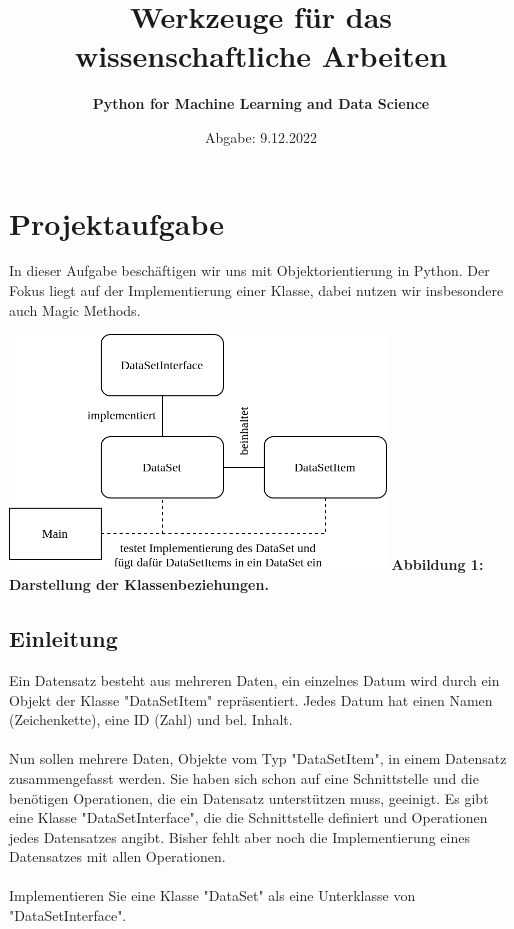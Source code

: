 \documentclass{article}
\begin{document}
	\title{\bf Werkzeuge für das wissenschaftliche Arbeiten}
	\author{\bf Python for Machine Learning and Data Science}
	\date{Abgabe: 9.12.2022}
	\maketitle
	
	\tableofcontents
	
	\section{Projektaufgabe}
		In dieser Aufgabe beschäftigen wir uns mit Objektorientierung in Python.
		Der Fokus liegt auf der Implementierung einer Klasse, dabei nutzen wir insbesondere auch Magic Methods.
		
		\hspace*{2cm}\includegraphics[width=10cm]{./../diagram/classes_files.png}
		\hspace*{3cm}\scriptsize\bf Abbildung 1: \normalfont Darstellung der Klassenbeziehungen.\normalsize

		\subsection{Einleitung}
			Ein Datensatz besteht aus mehreren Daten, ein einzelnes Datum wird durch ein Objekt der Klasse "DataSetItem" repräsentiert.
			Jedes Datum hat einen Namen (Zeichenkette), eine ID (Zahl) und bel. Inhalt.\\
			\\
			Nun sollen mehrere Daten, Objekte vom Typ "DataSetItem", in einem Datensatz zusammengefasst werden.
			Sie haben sich schon auf eine Schnittstelle und die benötigen Operationen, die ein Datensatz unterstützen muss, geeinigt.
			Es gibt eine Klasse "DataSetInterface", die die Schnittstelle definiert und Operationen jedes Datensatzes angibt.
			Bisher fehlt aber noch die Implementierung eines Datensatzes mit allen Operationen.\\
			\\
			Implementieren Sie eine Klasse "DataSet" als eine Unterklasse von "DataSetInterface".\\
	
\end{document}
